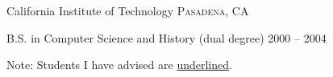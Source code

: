 \documentclass[10pt,a4paper]{article} %
\begin{document}

\headedsection %
{California Institute of Technology}
{\textsc{Pasadena, CA}} {

\headedsubsection %
{B.S. in Computer Science and History (dual degree)}
{2000 -- 2004} {}
}

\spacedhrule{0.5em}{-0.4em} %



\inlineheadsection %
{Note:}
{Students I have advised are \underline{underlined}.}
\end{document}
